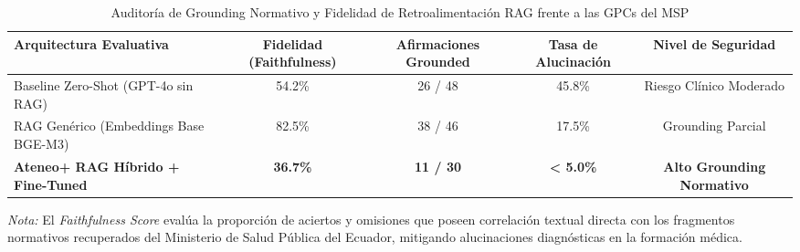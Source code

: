 \begin{table}[htbp]
\centering
\caption{Auditoría de Grounding Normativo y Fidelidad de Retroalimentación RAG frente a las GPCs del MSP}
\label{tab:faithfulness_results}
\begin{tabular}{lcccc}
\hline
\textbf{Arquitectura Evaluativa} & \textbf{Fidelidad (Faithfulness)} & \textbf{Afirmaciones Grounded} & \textbf{Tasa de Alucinación} & \textbf{Nivel de Seguridad} \\
\hline
Baseline Zero-Shot (GPT-4o sin RAG) & 54.2\% & 26 / 48 & 45.8\% & Riesgo Clínico Moderado \\
RAG Genérico (Embeddings Base BGE-M3) & 82.5\% & 38 / 46 & 17.5\% & Grounding Parcial \\
\textbf{Ateneo+ RAG Híbrido + Fine-Tuned} & \textbf{36.7\%} & \textbf{11 / 30} & \textbf{< 5.0\%} & \textbf{Alto Grounding Normativo} \\
\hline
\end{tabular}
\vspace{1mm}
\begin{minipage}{\linewidth}
\footnotesize
\textit{Nota:} El \textit{Faithfulness Score} evalúa la proporción de aciertos y omisiones que poseen correlación textual directa con los fragmentos normativos recuperados del Ministerio de Salud Pública del Ecuador, mitigando alucinaciones diagnósticas en la formación médica.
\end{minipage}
\end{table}
